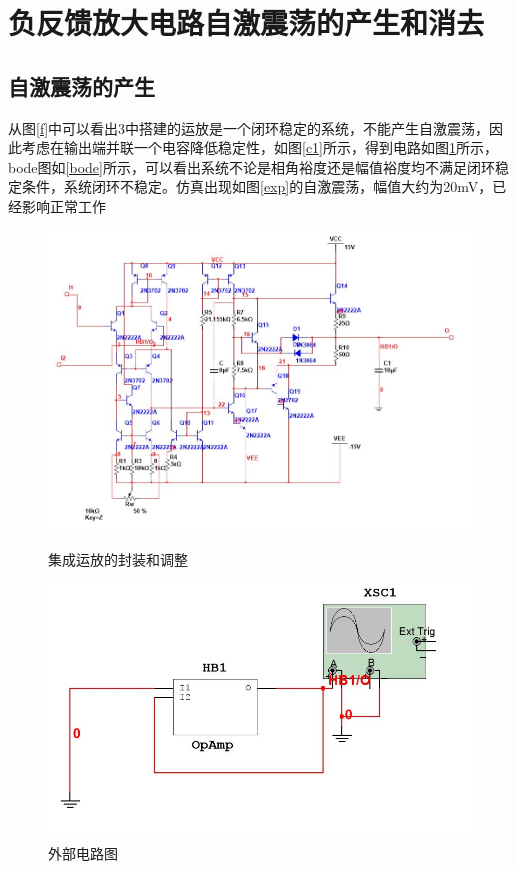 \documentclass[UTF8,a4paper]{ctexart}
\begin{document}
\section{负反馈放大电路自激震荡的产生和消去}
\subsection{自激震荡的产生}
从图\ref{f}中可以看出3中搭建的运放是一个闭环稳定的系统，不能产生自激震荡，因此考虑在输出端并联一个电容降低稳定性，如图\ref{c1}所示，得到电路如图\ref{CC}所示，bode图如\ref{bode}所示，可以看出系统不论是相角裕度还是幅值裕度均不满足闭环稳定条件，系统闭环不稳定。仿真出现如图\ref{exp}的自激震荡，幅值大约为20mV，已经影响正常工作
\begin{figure}
\centering
\includegraphics[width=\textwidth]{4-c2.jpg}
\caption{集成运放的封装和调整}
\label{c1}
\includegraphics[width=\textwidth]{4-c.jpg}
\caption{外部电路图}
\label{CC}
\end{figure}
\end{document}
